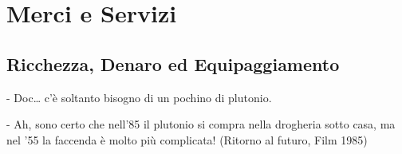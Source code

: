 \section{Merci e Servizi}

\subsection{Ricchezza, Denaro ed Equipaggiamento}

\begin{enfasi}{
- Doc… c'è soltanto bisogno di un pochino di plutonio.

\medskip

- Ah, sono certo che nell'85 il plutonio si compra nella drogheria sotto casa, ma nel '55 la faccenda è molto più complicata! (Ritorno al futuro, Film 1985)}
\end{enfasi}


